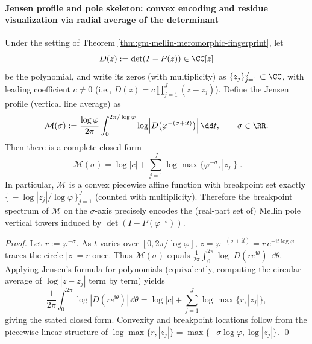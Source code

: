 \paragraph{Jensen profile and pole skeleton: convex encoding and residue visualization via radial average of the determinant}
\begin{proposition}\label{prop:gm-mellin-jensen-profile-det}
Under the setting of Theorem \ref{thm:gm-mellin-meromorphic-fingerprint}, let
\[
D(z):=\det(I-P(z))\in\CC[z]
\]
be the polynomial, and write its zeros (with multiplicity) as \(\{z_j\}_{j=1}^{J}\subset\CC\), with leading coefficient \(c\neq 0\) (i.e., \(D(z)=c\prod_{j=1}^{J}(z-z_j)\)).
Define the Jensen profile (vertical line average) as
\[
\mathcal{M}(\sigma)
:=\frac{\log\varphi}{2\pi}\int_{0}^{2\pi/\log\varphi}
\log\Bigl|D\bigl(\varphi^{-(\sigma+\mathrm{i}t)}\bigr)\Bigr|\,\dd t,
\qquad \sigma\in\RR.
\]
Then there is a complete closed form
\[
\boxed{\;
\mathcal{M}(\sigma)=\log|c|+\sum_{j=1}^{J}\log\max\!\bigl\{\varphi^{-\sigma},|z_j|\bigr\}\; }.
\]
In particular, \(\mathcal{M}\) is a convex piecewise affine function with breakpoint set exactly
\(
\{\,-\log|z_j|/\log\varphi\,\}_{j=1}^{J}
\)
(counted with multiplicity).
Therefore the breakpoint spectrum of \(\mathcal{M}\) on the \(\sigma\)-axis precisely encodes the (real-part set of) Mellin pole vertical towers induced by
\(\det(I-P(\varphi^{-s}))\).
\end{proposition}
\begin{proof}
Let \(r:=\varphi^{-\sigma}\).
As \(t\) varies over \([0,2\pi/\log\varphi]\),
\(
z=\varphi^{-(\sigma+\mathrm{i}t)}=r\,e^{-\mathrm{i}t\log\varphi}
\)
traces the circle \(|z|=r\) once.
Thus \(\mathcal{M}(\sigma)\) equals \(\frac{1}{2\pi}\int_{0}^{2\pi}\log|D(re^{\mathrm{i}\theta})|\,\dd\theta\).
Applying Jensen's formula for polynomials (equivalently, computing the circular average of \(\log|z-z_j|\) term by term) yields
\[
\frac{1}{2\pi}\int_{0}^{2\pi}\log|D(re^{\mathrm{i}\theta})|\,\dd\theta
=\log|c|+\sum_{j=1}^{J}\log\max\{r,|z_j|\},
\]
giving the stated closed form.
Convexity and breakpoint locations follow from the piecewise linear structure of \(\log\max\{r,|z_j|\}=\max\{-\sigma\log\varphi,\log|z_j|\}\). \qed
\end{proof}

